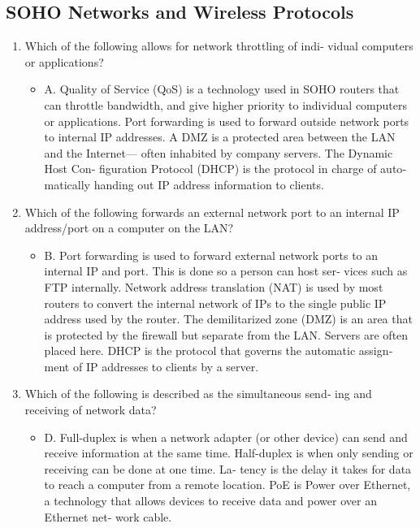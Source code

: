 \documentclass{article}
\begin{document}
\subsection{SOHO Networks and Wireless Protocols} 
\begin{enumerate}
     \item Which of the following allows for network throttling of indi‐
vidual computers or applications?
    \begin{itemize}
        \item A. Quality of Service (QoS) is a technology used in SOHO
routers that can throttle bandwidth, and give higher priority to
individual computers or applications. Port forwarding is used
to forward outside network ports to internal IP addresses. A
DMZ is a protected area between the LAN and the Internet—
often inhabited by company servers. The Dynamic Host Con‐
figuration Protocol (DHCP) is the protocol in charge of auto‐
matically handing out IP address information to clients.
    \end{itemize}
    \item Which of the following forwards an external network port to an
internal IP address/port on a computer on the LAN?
    \begin{itemize}
        \item B. Port forwarding is used to forward external network ports to
an internal IP and port. This is done so a person can host ser‐
vices such as FTP internally. Network address translation
(NAT) is used by most routers to convert the internal network
of IPs to the single public IP address used by the router. The
demilitarized zone (DMZ) is an area that is protected by the
firewall but separate from the LAN. Servers are often placed
here. DHCP is the protocol that governs the automatic assign‐
ment of IP addresses to clients by a server.
    \end{itemize}
    \item Which of the following is described as the simultaneous send‐
ing and receiving of network data?
    \begin{itemize}
        \item D. Full-duplex is when a network adapter (or other device) can
send and receive information at the same time. Half-duplex is
when only sending or receiving can be done at one time. La‐
tency is the delay it takes for data to reach a computer from a
remote location. PoE is Power over Ethernet, a technology that
allows devices to receive data and power over an Ethernet net‐
work cable.
    \end{itemize}

\end{enumerate}
\end{document}
